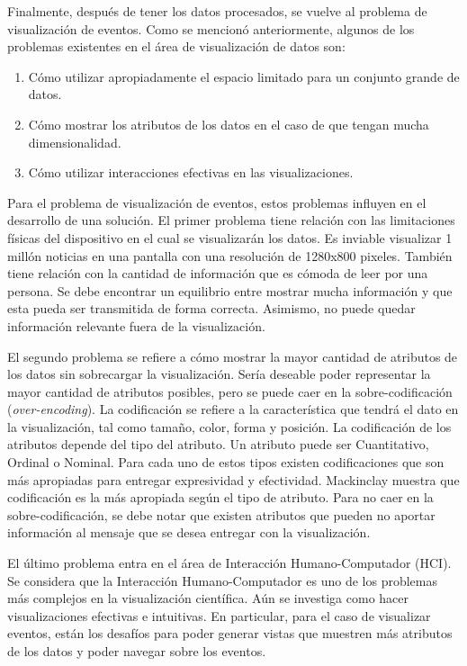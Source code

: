 \documentclass[10pt]{article}
\begin{document}
	Finalmente, después de tener los datos procesados, se vuelve al problema de visualización de eventos. Como se mencionó anteriormente, algunos de los problemas existentes en el área de visualización de datos son:
	
	\begin{enumerate}
		\item Cómo utilizar apropiadamente el espacio limitado para un conjunto grande de datos.
		\item Cómo mostrar los atributos de los datos en el caso de que tengan mucha dimensionalidad.
		\item Cómo utilizar interacciones efectivas en las visualizaciones.
	\end{enumerate}
	
	Para el problema de visualización de eventos, estos problemas influyen en el desarrollo de una solución. El primer problema tiene relación con las limitaciones físicas del dispositivo en el cual se visualizarán los datos. Es inviable visualizar 1 millón noticias en una pantalla con una resolución de 1280x800 pixeles. También tiene relación con la cantidad de información que es cómoda de leer por una persona. Se debe encontrar un equilibrio entre mostrar mucha información y que esta pueda ser transmitida de forma correcta. Asimismo, no puede quedar información relevante fuera de la visualización.
	
	El segundo problema se refiere a cómo mostrar la mayor cantidad de atributos de los datos sin sobrecargar la visualización. Sería deseable poder representar la mayor cantidad de atributos posibles, pero se puede caer en la sobre-codificación (\emph{over-encoding}). La codificación se refiere a la característica que tendrá el dato en la visualización, tal como tamaño, color, forma y posición. La codificación de los atributos depende del tipo del atributo. Un atributo puede ser Cuantitativo, Ordinal o Nominal. Para cada uno de estos tipos existen codificaciones que son más apropiadas para entregar expresividad y efectividad. Mackinclay\cite{mackinlay} muestra que codificación es la más apropiada según el tipo de atributo. Para no caer en la sobre-codificación, se debe notar que existen atributos que pueden no aportar información al mensaje que se desea entregar con la visualización.
	
	El último problema entra en el área de Interacción Humano-Computador (HCI). Se considera que la Interacción Humano-Computador es uno de los problemas más complejos en la visualización científica\cite{visproblems}. Aún se investiga como hacer visualizaciones efectivas e intuitivas. En particular, para el caso de visualizar eventos, están los desafíos para poder generar vistas que muestren más atributos de los datos y poder navegar sobre los eventos.
	
\end{document}
